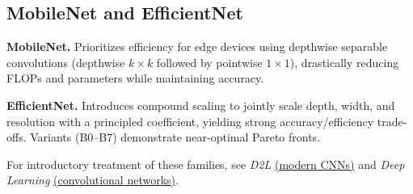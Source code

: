 \subsection{MobileNet and EfficientNet}

\textbf{MobileNet.} Prioritizes efficiency for edge devices using depthwise separable convolutions (depthwise $k\times k$ followed by pointwise $1\times1$), drastically reducing FLOPs and parameters while maintaining accuracy.

\textbf{EfficientNet.} Introduces compound scaling to jointly scale depth, width, and resolution with a principled coefficient, yielding strong accuracy/efficiency trade-offs. Variants (B0--B7) demonstrate near-optimal Pareto fronts.

For introductory treatment of these families, see \textit{D2L} \href{https://d2l.ai/chapter_convolutional-modern/index.html}{(modern CNNs)} and \textit{Deep Learning} \href{https://www.deeplearningbook.org/contents/convnets.html}{(convolutional networks)}.


